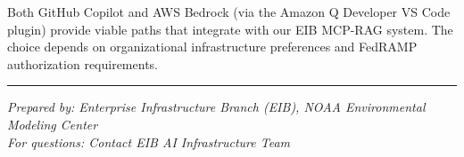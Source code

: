 \documentclass[11pt]{article}
\begin{document}
Both GitHub Copilot and AWS Bedrock (via the Amazon Q Developer VS Code plugin) provide viable paths that integrate with our EIB MCP-RAG system. The choice depends on organizational infrastructure preferences and FedRAMP authorization requirements.

\vspace{1em}
\noindent\rule{\textwidth}{0.4pt}
\small
\textit{Prepared by: Enterprise Infrastructure Branch (EIB), NOAA Environmental Modeling Center}\\
\textit{For questions: Contact EIB AI Infrastructure Team}
\end{document}
